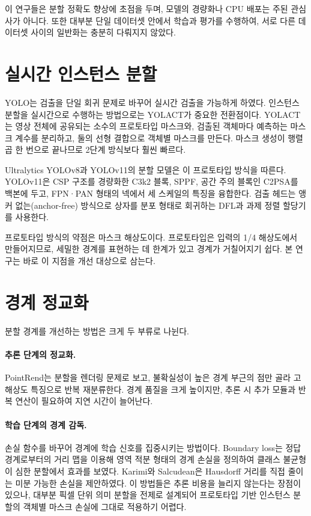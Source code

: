 이 연구들은 분할 정확도 향상에 초점을 두며, 모델의 경량화나 CPU 배포는 주된 관심사가 아니다.
또한 대부분 단일 데이터셋 안에서 학습과 평가를 수행하여, 서로 다른 데이터셋 사이의 일반화는
충분히 다뤄지지 않았다.

\section{실시간 인스턴스 분할}\label{sec:rw_realtime}

YOLO\citep{redmon2016yolo}는 검출을 단일 회귀 문제로 바꾸어 실시간 검출을 가능하게 하였다.
인스턴스 분할을 실시간으로 수행하는 방법으로는 YOLACT\citep{bolya2019yolact}가 중요한 전환점이다.
YOLACT는 영상 전체에 공유되는 소수의 프로토타입 마스크와, 검출된 객체마다 예측하는 마스크 계수를
분리하고, 둘의 선형 결합으로 객체별 마스크를 만든다. 마스크 생성이 행렬 곱 한 번으로 끝나므로
2단계 방식보다 훨씬 빠르다.

Ultralytics YOLOv8과 YOLOv11\citep{jocher2024yolo11}의 분할 모델은 이 프로토타입 방식을 따른다.
YOLOv11은 CSP 구조\citep{wang2020cspnet}를 경량화한 C3k2 블록, SPPF, 공간 주의 블록인 C2PSA를
백본에 두고, FPN\citep{lin2017fpn}·PAN\citep{liu2018panet} 형태의 넥에서 세 스케일의 특징을 융합한다.
검출 헤드는 앵커 없는(anchor-free) 방식으로 상자를 분포 형태로 회귀하는 DFL\citep{li2020gfl}과
과제 정렬 할당기\citep{feng2021tood}를 사용한다.

프로토타입 방식의 약점은 마스크 해상도이다. 프로토타입은 입력의 1/4 해상도에서 만들어지므로,
세밀한 경계를 표현하는 데 한계가 있고 경계가 거칠어지기 쉽다. 본 연구는 바로 이 지점을 개선
대상으로 삼는다.

\section{경계 정교화}\label{sec:rw_boundary}

분할 경계를 개선하는 방법은 크게 두 부류로 나뉜다.

\paragraph{추론 단계의 정교화.} PointRend\citep{kirillov2020pointrend}는 분할을 렌더링 문제로 보고,
불확실성이 높은 경계 부근의 점만 골라 고해상도 특징으로 반복 재분류한다. 경계 품질을 크게 높이지만,
추론 시 추가 모듈과 반복 연산이 필요하여 지연 시간이 늘어난다.

\paragraph{학습 단계의 경계 감독.} 손실 함수를 바꾸어 경계에 학습 신호를 집중시키는 방법이다.
Boundary loss\citep{kervadec2019boundary}는 정답 경계로부터의 거리 맵을 이용해 영역 적분 형태의
경계 손실을 정의하여 클래스 불균형이 심한 분할에서 효과를 보였다. Karimi와 Salcudean\citep{karimi2020hausdorff}은
Hausdorff 거리를 직접 줄이는 미분 가능한 손실을 제안하였다. 이 방법들은 추론 비용을 늘리지 않는다는
장점이 있으나, 대부분 픽셀 단위 의미 분할을 전제로 설계되어 프로토타입 기반 인스턴스 분할의
객체별 마스크 손실에 그대로 적용하기 어렵다.

